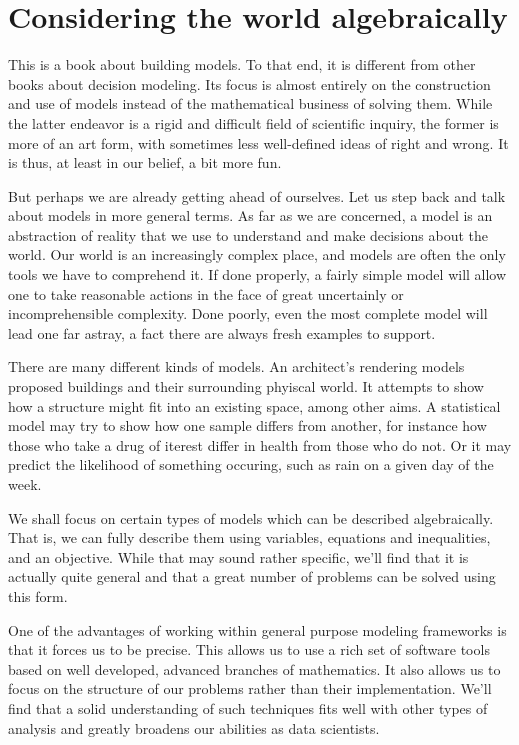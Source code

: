 \chapter{Considering the world algebraically}

This is a book about building models. To that end, it is different from other books about decision modeling. Its focus is almost entirely on the construction and use of models instead of the mathematical business of solving them. While the latter endeavor is a rigid and difficult field of scientific inquiry, the former is more of an art form, with sometimes less well-defined ideas of right and wrong. It is thus, at least in our belief, a bit more fun.

But perhaps we are already getting ahead of ourselves. Let us step back and talk about models in more general terms. As far as we are concerned, a model is an abstraction of reality that we use to understand and make decisions about the world. Our world is an increasingly complex place, and models are often the only tools we have to comprehend it. If done properly, a fairly simple model will allow one to take reasonable actions in the face of great uncertainly or incomprehensible complexity. Done poorly, even the most complete model will lead one far astray, a fact there are always fresh examples to support.

There are many different kinds of models. An architect's rendering models proposed buildings and their surrounding phyiscal world. It attempts to show how a structure might fit into an existing space, among other aims. A statistical model may try to show how one sample differs from another, for instance how those who take a drug of iterest differ in health from those who do not. Or it may predict the likelihood of something occuring, such as rain on a given day of the week.

We shall focus on certain types of models which can be described algebraically. That is, we can fully describe them using variables, equations and inequalities, and an objective. While that may sound rather specific, we'll find that it is actually quite general and that a great number of problems can be solved using this form.

One of the advantages of working within general purpose modeling frameworks is that it forces us to be precise. This allows us to use a rich set of software tools based on well developed, advanced branches of mathematics. It also allows us to focus on the structure of our problems rather than their implementation. We'll find that a solid understanding of such techniques fits well with other types of analysis and greatly broadens our abilities as data scientists.


